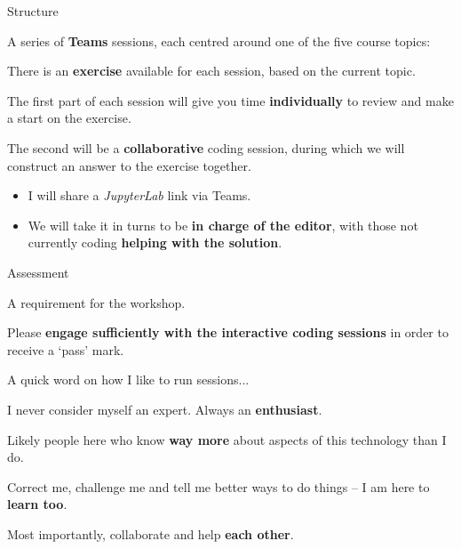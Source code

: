 \documentclass[10pt, dvipsnames, table, aspectratio=169]{beamer}
\begin{document}
\begin{frame}{Structure}

A series of \textbf{Teams} sessions, each centred around one of the five course topics:

\begin{centering}

\begin{table}[h!]

    \centering

    

\end{table}

\end{centering}

\framebreak

There is an \textbf{exercise} available for each session, based on the current topic.

The first part of each session will give you time \textbf{individually} to review and make a start on the exercise.

The second will be a \textbf{collaborative} coding session, during which we will construct an answer to the exercise together.

\begin{itemize}

  \item I will share a \emph{JupyterLab} link via Teams.

  \item We will take it in turns to be \textbf{in charge of the editor}, with those not currently coding \textbf{helping with the solution}.

\end{itemize}

\end{frame}


\begin{frame}[fragile]{Assessment}

A requirement for the workshop.

Please \textbf{engage sufficiently with the interactive coding sessions} in order to receive a `pass' mark.

\end{frame}


\begin{frame}[fragile]{A quick word on how I like to run sessions...}

I never consider myself an expert. Always an \textbf{enthusiast}.

Likely people here who know \textbf{way more} about aspects of this technology than I do.

Correct me, challenge me and tell me better ways to do things -- I am here to \textbf{learn too}.

Most importantly, collaborate and help \textbf{each other}.

\end{frame}
\end{document}
